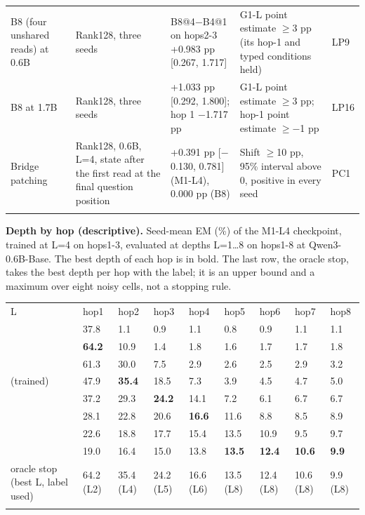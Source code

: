 {\begin{longtable}{W{132}{10}W{253}{10}W{264}{10}W{287}{10}W{64}{10}}
B8 (four unshared reads) at 0.6B & Rank128, three seeds & B8@4\ensuremath{-}B4@1 on hops2-3 +0.983 pp [0.267, 1.717] & G1-L point estimate \ensuremath{\geq}3 pp (its hop-1 and typed conditions held) & LP9 \\ \addlinespace[3pt]
B8 at 1.7B & Rank128, three seeds & +1.033 pp [0.292, 1.800]; hop 1 \ensuremath{-}1.717 pp & G1-L point estimate \ensuremath{\geq}3 pp; hop-1 point estimate \ensuremath{\geq}\ensuremath{-}1 pp & LP16 \\ \addlinespace[3pt]
Bridge patching & Rank128, 0.6B, L=4, state after the first read at the final question position & +0.391 pp [\ensuremath{-}0.130, 0.781] (M1-L4), 0.000 pp (B8) & Shift \ensuremath{\geq}10 pp, 95\% interval above 0, positive in every seed & PC1 \\ \addlinespace[3pt]
\bottomrule
\end{longtable}
}



\textbf{Depth by hop (descriptive).} Seed-mean EM (\%) of the M1-L4 checkpoint, trained at L=4 on hops1-3, evaluated at depths L=1\ldots{}8 on hops1-8 at
Qwen3-0.6B-Base. The best depth of each hop is in bold. The last row, the oracle stop, takes the best depth per hop with the label; it is an upper
bound and a maximum over eight noisy cells, not a stopping rule.  %


{\footnotesize
\setlength{\tabcolsep}{3pt}
\begin{longtable}{W{111}{18}W{111}{18}W{111}{18}W{111}{18}W{111}{18}W{111}{18}W{111}{18}W{111}{18}W{111}{18}}
\toprule
L & hop1 & hop2 & hop3 & hop4 & hop5 & hop6 & hop7 & hop8 \\ \addlinespace[3pt]
\midrule {} & 37.8 & 1.1 & 0.9 & 1.1 & 0.8 & 0.9 & 1.1 & 1.1 \\  & \textbf{64.2} & 10.9 & 1.4 & 1.8 & 1.6 & 1.7 & 1.7 & 1.8 \\  & 61.3 & 30.0 & 7.5 & 2.9 & 2.6 & 2.5 & 2.9 & 3.2 \\  (trained) & 47.9 & \textbf{35.4} & 18.5 & 7.3 & 3.9 & 4.5 & 4.7 & 5.0 \\  & 37.2 & 29.3 & \textbf{24.2} & 14.1 & 7.2 & 6.1 & 6.7 & 6.7 \\  & 28.1 & 22.8 & 20.6 & \textbf{16.6} & 11.6 & 8.8 & 8.5 & 8.9 \\  & 22.6 & 18.8 & 17.7 & 15.4 & 13.5 & 10.9 & 9.5 & 9.7 \\  & 19.0 & 16.4 & 15.0 & 13.8 & \textbf{13.5} & \textbf{12.4} & \textbf{10.6} & \textbf{9.9} \\ \addlinespace[3pt]
oracle stop (best L, label used) & 64.2 (L2) & 35.4 (L4) & 24.2 (L5) & 16.6 (L6) & 13.5 (L8) & 12.4 (L8) & 10.6 (L8) & 9.9 (L8) \\ \addlinespace[3pt]
\bottomrule
\end{longtable}
}



